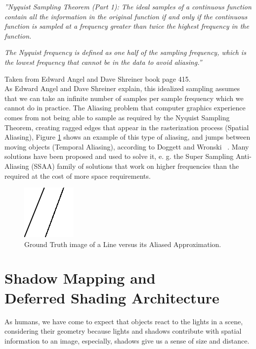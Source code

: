 \documentclass{cslthse-msc}
\begin{document}
\emph{''Nyquist Sampling Theorem (Part 1): The ideal samples of a continuous function contain all the information in the original function if and only if the continuous function is sampled at a frequency greater than twice the highest frequency in the function.}

\emph{The Nyquist frequency is defined as one half of the sampling frequency, which is the lowest frequency that cannot be in the data to avoid aliasing.''
}

Taken from Edward Angel and Dave Shreiner book page 415. \cite{Shreiner2011} \\

As Edward Angel and Dave Shreiner explain, this idealized sampling assumes that we can take an infinite number of samples per sample frequency which we cannot do in practice. The Aliasing problem that computer graphics experience comes from not being able to sample as required by the Nyquist Sampling Theorem, creating ragged edges that appear in the rasterization process (Spatial Aliasing), Figure \ref{fig:aliasingexample} shows an example of this type of aliasing, and jumps between moving objects (Temporal Aliasing), according to Doggett and Wronski  ~\cite{Doggett2017EDAN35,Wronski2014}. Many solutions have been proposed and used to solve it, e. g. the Super Sampling Anti-Aliasing (SSAA) family of solutions that work on higher frequencies than the required at the cost of more space requirements. 

\begin{figure}[!hbt]
	\centering
	\includegraphics[scale=1.0]{images/aliasing_example.png} 
	\caption{Ground Truth image of a Line versus its Aliased Approximation.}\label{fig:aliasingexample}
\end{figure}

\section[Shadow Mapping and Deferred Shading Architecture]{Shadow Mapping and \\ Deferred Shading Architecture}

As humans, we have come to expect that objects react to the lights in a scene, considering their geometry because lights and shadows contribute with spatial information to an image, especially, shadows give us a sense of size and distance.
\end{document}
